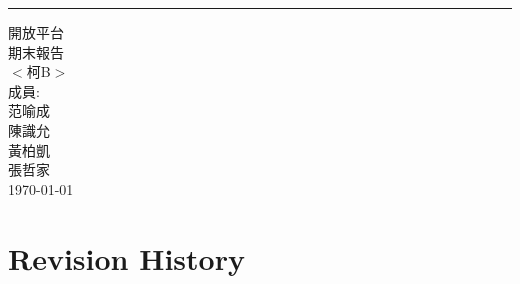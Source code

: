 \documentclass{scrreprt}
\date{}
\begin{document}
\begin{CJK}{UTF8}{bkai}
\begin{flushright}
    \rule{16cm}{5pt}\vskip1cm
    \begin{bfseries}
        \Huge{開放平台\\期末報告}\\
        \vspace{2.5 cm}
        $<$柯B$>$\\
        \vspace{2.5 cm}
        \LARGE{成員:}\\
        \vspace{1.0cm}
        范喻成\\
        \vspace{0.5cm}
        陳識允\\
        \vspace{0.5cm}
        黃柏凱\\
        \vspace{0.5cm}
        張哲家\\
        \vspace{0.5cm}
        \today\\
    \end{bfseries}
\end{flushright}

\tableofcontents

\chapter*{Revision History}


\end{CJK}
\end{document}
